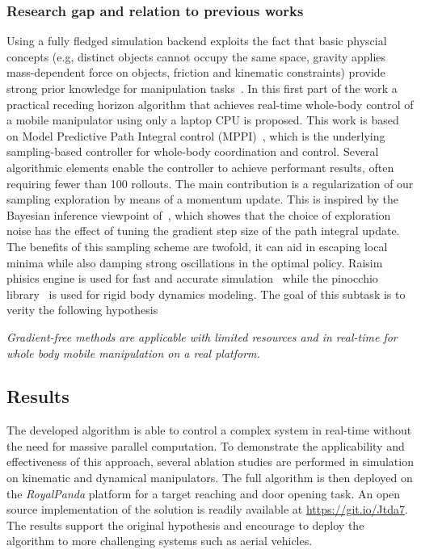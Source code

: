 \subsubsection{Research gap and relation to previous works}
Using a fully fledged simulation backend exploits the fact that basic physcial concepts (e.g, distinct objects cannot occupy the same space, gravity applies mass-dependent force on objects, friction and kinematic constraints) provide strong prior knowledge for manipulation tasks~\cite{kroemer2019review}. In this first part of the work a practical receding horizon algorithm that achieves real-time whole-body control of a mobile manipulator using only a laptop CPU is proposed. This work is based on Model Predictive Path Integral control (MPPI)~\cite{williams_information_2017}, which is the underlying sampling-based controller for whole-body coordination and control. Several algorithmic elements enable the controller to achieve performant results, often requiring fewer than 100 rollouts. The main contribution is a regularization of our sampling exploration by means of a momentum update. This is inspired by the Bayesian inference viewpoint of~\cite{lambert_stein_2020}, which showes that the choice of exploration noise has the effect of tuning the gradient step size of the path integral update. The benefits of this sampling scheme are twofold, it can aid in escaping local minima while also damping strong oscillations in the optimal policy. Raisim phisics engine is used for fast and accurate simulation~\cite{raisim} while the pinocchio library~\cite{pinocchioweb} is used for rigid body dynamics modeling. The goal of this subtask is to verity the following hypothesis
\begin{displayquote}
\textit{Gradient-free methods are applicable with limited resources and in real-time for whole body mobile manipulation on a real platform.}
\end{displayquote}

\subsection{Results}
The developed algorithm is able to control a complex system in real-time without the need for massive parallel computation. To demonstrate the applicability and effectiveness of this approach, several ablation studies are performed in simulation on kinematic and dynamical manipulators. The full algorithm is then deployed on the \textit{RoyalPanda} platform for a target reaching and door opening task. An open source implementation of the solution is readily available at \url{https://git.io/Jtda7}. The results support the original hypothesis and encourage to deploy the algorithm to more challenging systems such as aerial vehicles.

